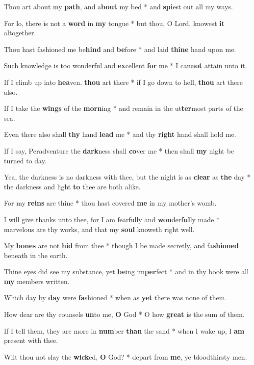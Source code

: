 \begin{multicols}{2}
	Thou art about my \textbf{path}, and a\textbf{bout} my bed * and \textbf{spi}est out all my ways.
	
	For lo, there is not a \textbf{word} in \textbf{my} tongue * but thou, O Lord, knowest \textbf{it} altogether.
	
	Thou hast fashioned me be\textbf{hind} and \textbf{be}fore * and laid \textbf{thine} hand upon me.
	
	Such knowledge is too wonderful and \textbf{ex}cellent \textbf{for} me * I can\textbf{not} attain unto it.
	
	If I climb up into \textbf{hea}ven, \textbf{thou} art there * if I go down to hell, \textbf{thou} art there also.
	
	If I take the \textbf{wings} of the \textbf{morn}ing * and remain in the ut\textbf{ter}most parts of the sea.
	
	Even there also shall \textbf{thy} hand \textbf{lead} me * and thy \textbf{right} hand shall hold me.
	
	If I say, Peradventure the \textbf{dark}ness shall \textbf{co}ver me * then shall \textbf{my} night be turned to day.
	
	Yea, the darkness is no darkness with thee, but the night is as \textbf{clear} as \textbf{the} day * the darkness and light \textbf{to} thee are both alike.
	
	For my \textbf{reins} are thine * thou hast covered \textbf{me} in my mother's womb.
	
	I will give thanks unto thee, for I am fearfully and \textbf{won}der\textbf{ful}ly made * marvelous are thy works, and that my \textbf{soul} knoweth right well.
	
	My \textbf{bones} are not \textbf{hid} from thee * though I be made secretly, and fa\textbf{shioned} beneath in the earth.
	
	Thine eyes did see my substance, yet \textbf{be}ing im\textbf{per}fect * and in thy book were all \textbf{my} members written.
	
	Which day by \textbf{day} were \textbf{fa}shioned * when as \textbf{yet} there was none of them.
	
	How dear are thy counsels \textbf{un}to me, \textbf{O} God * O how \textbf{great} is the sum of them.
	
	If I tell them, they are more in \textbf{num}ber \textbf{than} the sand * when I wake up, I \textbf{am} present with thee.
	
	Wilt thou not slay the \textbf{wick}ed, \textbf{O} God? * depart from \textbf{me}, ye bloodthirsty men.
	

\end{multicols}
